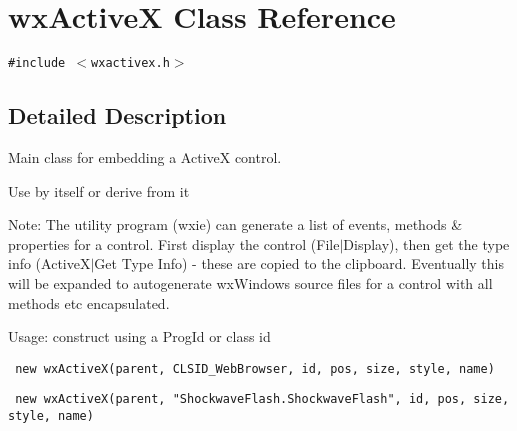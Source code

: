 \section{wx\-Active\-X Class Reference}
\label{classwxActiveX}
{\tt \#include $<$wxactivex.h$>$}



\subsection{Detailed Description}
Main class for embedding a Active\-X control.

Use by itself or derive from it \begin{Desc}
\item[Note:]The utility program (wxie) can generate a list of events, methods \& properties for a control. First display the control (File$|$Display), then get the type info (Active\-X$|$Get Type Info) - these are copied to the clipboard. Eventually this will be expanded to autogenerate wx\-Windows source files for a control with all methods etc encapsulated. \end{Desc}
\begin{Desc}
\item[Usage: ]construct using a Prog\-Id or class id 

\footnotesize\begin{verbatim} new wxActiveX(parent, CLSID_WebBrowser, id, pos, size, style, name)
\end{verbatim}\normalsize


\footnotesize\begin{verbatim} new wxActiveX(parent, "ShockwaveFlash.ShockwaveFlash", id, pos, size, style, name)
\end{verbatim}\normalsize
\end{Desc}
